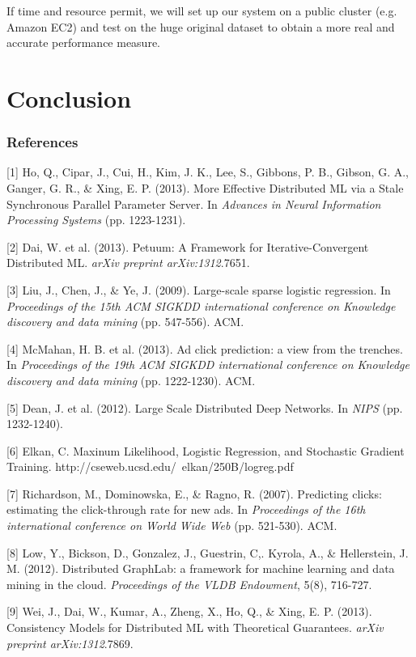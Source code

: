 \documentclass{article} %
\begin{document}
If time and resource permit, we will set up our system on a public cluster (e.g. Amazon EC2) and test on the huge original dataset to obtain a more real and accurate performance measure.

\section{Conclusion}


\subsubsection*{References}

\small{
[1] Ho, Q., Cipar, J., Cui, H., Kim, J. K., Lee, S., Gibbons, P. B., Gibson, G. A., Ganger, G. R., \& Xing, E. P. (2013). More Effective Distributed ML via a Stale Synchronous Parallel Parameter Server. In {\it Advances in Neural Information Processing Systems} (pp. 1223-1231).

[2] Dai, W. et al. (2013). Petuum: A Framework for Iterative-Convergent Distributed ML. {\it arXiv preprint arXiv:1312}.7651.

[3] Liu, J., Chen, J., \& Ye, J. (2009). Large-scale sparse logistic regression. In {\it Proceedings of the 15th ACM SIGKDD international conference on Knowledge discovery and data mining} (pp. 547-556). ACM.

[4] McMahan, H. B. et al. (2013). Ad click prediction: a view from the trenches. In {\it Proceedings of the 19th ACM SIGKDD international conference on Knowledge discovery and data mining} (pp. 1222-1230). ACM.

[5] Dean, J. et al. (2012). Large Scale Distributed Deep Networks. In {\it NIPS} (pp. 1232-1240).

[6] Elkan, C. Maxinum Likelihood, Logistic Regression, and Stochastic Gradient Training. http://cseweb.ucsd.edu/~elkan/250B/logreg.pdf

[7] Richardson, M., Dominowska, E., \& Ragno, R. (2007). Predicting clicks: estimating the click-through rate for new ads. In {\it Proceedings of the 16th international conference on World Wide Web} (pp. 521-530). ACM.

[8] Low, Y., Bickson, D., Gonzalez, J., Guestrin, C,. Kyrola, A., \& Hellerstein, J. M. (2012). Distributed GraphLab: a framework for machine learning and data mining in the cloud. {\it Proceedings of the VLDB Endowment}, 5(8), 716-727.

[9] Wei, J., Dai, W., Kumar, A., Zheng, X., Ho, Q., \& Xing, E. P. (2013). Consistency Models for Distributed ML with Theoretical Guarantees. {\it arXiv preprint arXiv:1312}.7869.

}
\end{document}
